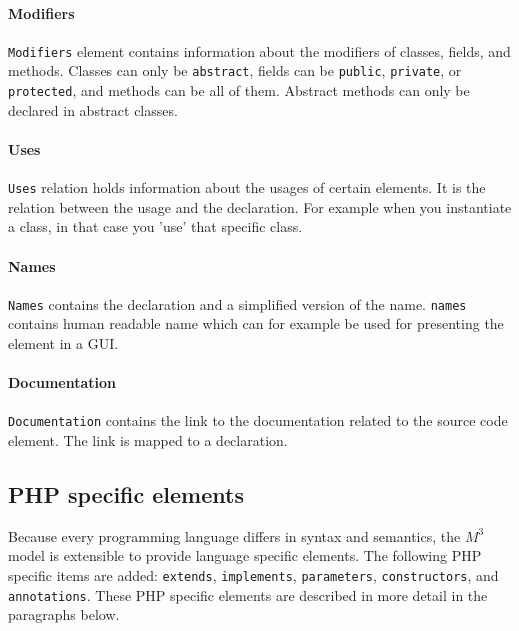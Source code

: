 \documentclass[../main.tex]{subfiles}
\begin{document}
    \paragraph{Modifiers} \texttt{Modifiers} element contains information about the modifiers of classes, fields, and methods. 
    Classes can only be \texttt{abstract}, fields can be \texttt{public}, \texttt{private}, or \texttt{protected}, and methods can be all of them. 
    Abstract methods can only be declared in abstract classes. 
    
    \paragraph{Uses} \texttt{Uses} relation holds information about the usages of certain elements.
    It is the relation between the usage and the declaration.
    For example when you instantiate a class, in that case you 'use' that specific class.
     
    \paragraph{Names} \texttt{Names} contains the declaration and a simplified version of the name.
    \texttt{names} contains human readable name which can for example be used for presenting the element in a GUI.
    
    \paragraph{Documentation} \texttt{Documentation} contains the link to the documentation related to the source code element.
    The link is mapped to a declaration.
    
    \subsection{PHP specific elements}
    Because every programming language differs in syntax and semantics, the $M^3$ model is extensible to provide language specific elements.
    The following PHP specific items are added: \texttt{extends}, \texttt{implements}, \texttt{parameters}, \texttt{constructors}, and \texttt{annotations}.
    These PHP specific elements are described in more detail in the paragraphs below.
\end{document}
